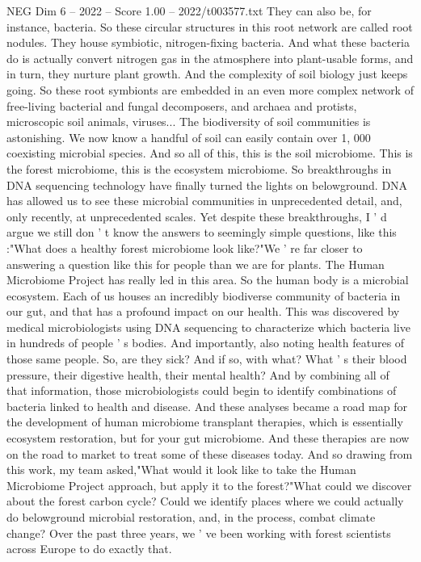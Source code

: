 \begin{textsample}{NEG Dim 6 – 2022 – Score 1.00 – 2022/t003577.txt}
They can also be, for instance, bacteria.
So these circular structures in this root network are called root nodules.
They house symbiotic, nitrogen-fixing bacteria.
And what these bacteria do is actually convert nitrogen gas in the atmosphere into plant-usable forms, and in turn, they nurture plant growth.
And the complexity of soil biology just keeps going.
So these root symbionts are embedded in an even more complex network of free-living bacterial and fungal decomposers, and archaea and protists, microscopic soil animals, viruses...
The biodiversity of soil communities is astonishing.
We now know a handful of soil can easily contain over 1, 000 coexisting microbial species.
And so all of this, this is the soil microbiome.
This is the forest microbiome, this is the ecosystem microbiome.
So breakthroughs in DNA sequencing technology have finally turned the lights on belowground.
DNA has allowed us to see these microbial communities in unprecedented detail, and, only recently, at unprecedented scales.
Yet despite these breakthroughs, I ' d argue we still don ' t know the answers to seemingly simple questions, like this :"What does a healthy forest microbiome look like?"We ' re far closer to answering a question like this for people than we are for plants.
The Human Microbiome Project has really led in this area.
So the human body is a microbial ecosystem.
Each of us houses an incredibly biodiverse community of bacteria in our gut, and that has a profound impact on our health.
This was discovered by medical microbiologists using DNA sequencing to characterize which bacteria live in hundreds of people ' s bodies.
And importantly, also noting health features of those same people.
So, are they sick?
And if so, with what?
What ' s their blood pressure, their digestive health, their mental health?
And by combining all of that information, those microbiologists could begin to identify combinations of bacteria linked to health and disease.
And these analyses became a road map for the development of human microbiome transplant therapies, which is essentially ecosystem restoration, but for your gut microbiome.
And these therapies are now on the road to market to treat some of these diseases today.
And so drawing from this work, my team asked,"What would it look like to take the Human Microbiome Project approach, but apply it to the forest?"What could we discover about the forest carbon cycle?
Could we identify places where we could actually do belowground microbial restoration, and, in the process, combat climate change?
Over the past three years, we ' ve been working with forest scientists across Europe to do exactly that.

\end{textsample}
